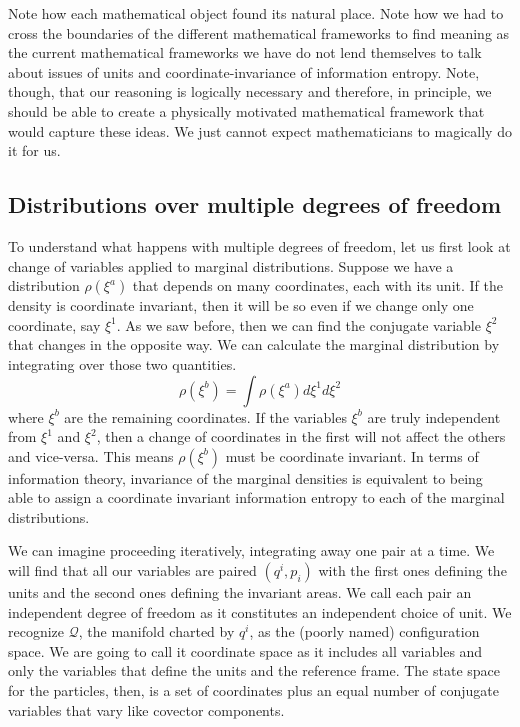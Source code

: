 \documentclass[11pt]{elsarticle}
\begin{document}
Note how each mathematical object found its natural place. Note how we had to cross the boundaries of the different mathematical frameworks to find meaning as the current mathematical frameworks we have do not lend themselves to talk about issues of units and coordinate-invariance of information entropy. Note, though, that our reasoning is logically necessary and therefore, in principle, we should be able to create a physically motivated mathematical framework that would capture these ideas. We just cannot expect mathematicians to magically do it for us.

\subsection*{Distributions over multiple degrees of freedom}

To understand what happens with multiple degrees of freedom, let us first look at change of variables applied to marginal distributions. Suppose we have a distribution $\rho(\xi^a)$ that depends on many coordinates, each with its unit. If the density is coordinate invariant, then it will be so even if we change only one coordinate, say $\xi^1$. As we saw before, then we can find the conjugate variable $\xi^2$ that changes in the opposite way. We can calculate the marginal distribution by integrating over those two quantities.
\begin{equation}
\rho(\xi^b) = \int \rho(\xi^a) d\xi^1 d\xi^2
\end{equation}
where $\xi^b$ are the remaining coordinates. If the variables $\xi^b$ are truly independent from $\xi^1$ and $\xi^2$, then a change of coordinates in the first will not affect the others and vice-versa. This means $\rho(\xi^b)$ must be coordinate invariant. In terms of information theory, invariance of the marginal densities is equivalent to being able to assign a coordinate invariant information entropy to each of the marginal distributions.

We can imagine proceeding iteratively, integrating away one pair at a time. We will find that all our variables are paired $(q^i, p_i)$  with the first ones defining the units and the second ones defining the invariant areas. We call each pair an independent degree of freedom as it constitutes an independent choice of unit. We recognize $\mathcal{Q}$, the manifold charted by $q^i$, as the (poorly named) configuration space. We are going to call it coordinate space as it includes all variables and only the variables that define the units and the reference frame. The state space for the particles, then, is a set of coordinates plus an equal number of conjugate variables that vary like covector components.
\end{document}
